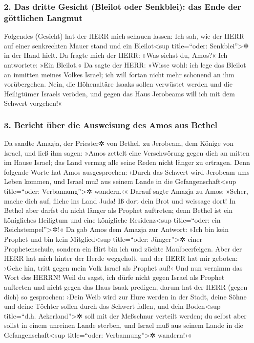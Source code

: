 \hypertarget{das-dritte-gesicht-bleilot-oder-senkblei-das-ende-der-guxf6ttlichen-langmut}{%
\subsubsection{2. Das dritte Gesicht (Bleilot oder Senkblei): das Ende
der göttlichen
Langmut}\label{das-dritte-gesicht-bleilot-oder-senkblei-das-ende-der-guxf6ttlichen-langmut}}

Folgendes (Gesicht) hat der HERR mich schauen lassen: Ich
sah, wie der HERR auf einer senkrechten Mauer stand und ein
Bleilot\textless sup title=``oder: Senkblei''\textgreater✲ in der Hand
hielt. Da fragte mich der HERR: »Was siehst du, Amos?« Ich
antwortete: »Ein Bleilot.« Da sagte der HERR: »Wisse wohl: ich lege das
Bleilot an inmitten meines Volkes Israel; ich will fortan nicht mehr
schonend an ihm vorübergehen. Nein, die Höhenaltäre Isaaks
sollen verwüstet werden und die Heiligtümer Israels veröden, und gegen
das Haus Jerobeams will ich mit dem Schwert vorgehen!«

\hypertarget{bericht-uxfcber-die-ausweisung-des-amos-aus-bethel}{%
\subsubsection{3. Bericht über die Ausweisung des Amos aus
Bethel}\label{bericht-uxfcber-die-ausweisung-des-amos-aus-bethel}}

Da sandte Amazja, der Priester✲ von Bethel, zu Jerobeam,
dem Könige von Israel, und ließ ihm sagen: »Amos zettelt eine
Verschwörung gegen dich an mitten im Hause Israel; das Land vermag alle
seine Reden nicht länger zu ertragen. Denn folgende Worte
hat Amos ausgesprochen: ›Durch das Schwert wird Jerobeam ums Leben
kommen, und Israel muß aus seinem Lande in die
Gefangenschaft\textless sup title=``oder: Verbannung''\textgreater✲
wandern.‹« Darauf sagte Amazja zu Amos: »Seher, mache
dich auf, fliehe ins Land Juda! Iß dort dein Brot und weissage dort!
In Bethel aber darfst du nicht länger als Prophet
auftreten; denn Bethel ist ein königliches Heiligtum und eine königliche
Residenz\textless sup title=``oder: ein Reichstempel''\textgreater✲!«
Da gab Amos dem Amazja zur Antwort: »Ich bin kein Prophet
und bin kein Mitglied\textless sup title=``oder: Jünger''\textgreater✲
einer Prophetenschule, sondern ein Hirt bin ich und züchte
Maulbeerfeigen. Aber der HERR hat mich hinter der Herde
weggeholt, und der HERR hat mir geboten: ›Gehe hin, tritt gegen mein
Volk Israel als Prophet auf!‹ Und nun vernimm das Wort
des HERRN! Weil du sagst, ich dürfe nicht gegen Israel als Prophet
auftreten und nicht gegen das Haus Isaak predigen, darum
hat der HERR (gegen dich) so gesprochen: ›Dein Weib wird zur Hure werden
in der Stadt, deine Söhne und deine Töchter sollen durch das Schwert
fallen, und dein Boden\textless sup title=``d.h.
Ackerland''\textgreater✲ soll mit der Meßschnur verteilt werden; du
selbst aber sollst in einem unreinen Lande sterben, und Israel muß aus
seinem Lande in die Gefangenschaft\textless sup title=``oder:
Verbannung''\textgreater✲ wandern!‹«

